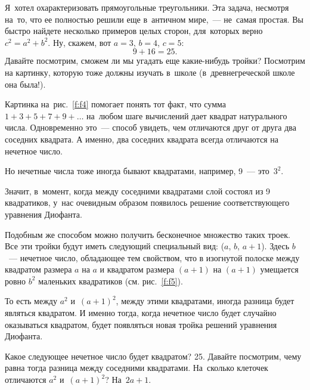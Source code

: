 Я~хотел охарактеризовать прямоугольные треугольники. Эта задача, несмотря на~то, что ее полностью
решили еще в~античном мире,~--- не~самая простая. Вы быстро найдете несколько примеров целых сторон,
для~которых верно $c^{2}=a^{2}+b^{2}$. Ну, скажем, вот $a=3$, $b=4$, $c=5$:
$$
9+16=25.
$$
Давайте посмотрим, сможем ли мы угадать еще какие-нибудь тройки? Посмотрим на картинку,
которую тоже должны изучать в~школе (в~древнегреческой школе она была!).


Картинка на~рис.~\ref{f:f4} помогает понять тот факт, что сумма
$1+3+5+7+9+\ldots$ на~любом шаге вычислений дает квадрат натурального числа.
Одновременно это~--- способ увидеть, чем отличаются друг от друга два соседних
квадрата. А именно, два соседних квадрата всегда отличаются на нечетное число.

Но нечетные числа тоже иногда бывают квадратами, например, 9~--- это~$3^{2}$.

Значит, в~момент, когда между соседними квадратами слой состоял из 9 квадратиков,
у~нас очевидным образом появилось решение соответствующего уравнения Диофанта.

\pagebreak

Подобным же способом можно получить бесконечное множество таких троек. Все эти
тройки будут иметь следующий специальный вид: ($a$, $b$, $a+1$). Здесь $b$~--- нечетное число, обладающее тем свойством, что в изогнутой полоске
между квадратом размера $a$ на $a$ и квадратом размера $(a+1)$ на $(a+1)$ умещается
ровно $b^2$ маленьких квадратиков (см. рис.~\ref{f:f5}).


То есть между $a^{2}$ и~$(a+1)^{2}$, между этими квадратами, иногда разница будет
являться квадратом. И именно тогда, когда нечетное число будет случайно оказываться
квадратом, будет появляться новая тройка решений уравнения Диофанта.

Какое следующее нечетное число будет квадратом? 25. Давайте посмотрим, чему равна
тогда разница между соседними квадратами. На~сколько клеточек отличаются $a^{2}$
и~$(a+1)^{2}$? На~$2a+1$.


